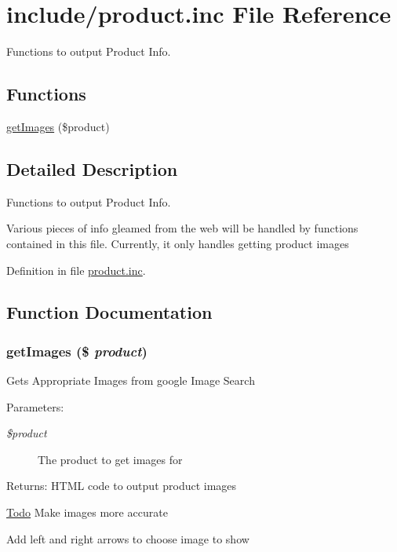\hypertarget{product_8inc}{
\section{include/product.inc File Reference}
\label{product_8inc}
}
Functions to output Product Info. 

\subsection*{Functions}
\begin{CompactItemize}
\item 
\hyperlink{product_8inc_9dbb778854cfe105058d7161ca8f058c}{getImages} (\$product)
\end{CompactItemize}


\subsection{Detailed Description}
Functions to output Product Info. 

Various pieces of info gleamed from the web will be handled by functions contained in this file. Currently, it only handles getting product images 

Definition in file \hyperlink{product_8inc-source}{product.inc}.

\subsection{Function Documentation}
\hypertarget{product_8inc_9dbb778854cfe105058d7161ca8f058c}{
\subsubsection{\setlength{\rightskip}{0pt plus 5cm}getImages (\$ {\em product})}}
\label{product_8inc_9dbb778854cfe105058d7161ca8f058c}


Gets Appropriate Images from google Image Search \begin{Desc}
\item[Parameters:]
\begin{description}
\item[{\em \$product}]The product to get images for \end{description}
\end{Desc}
\begin{Desc}
\item[Returns:]HTML code to output product images \end{Desc}
\begin{Desc}
\item[\hyperlink{todo__todo000001}{Todo}]Make images more accurate 

Add left and right arrows to choose image to show \end{Desc}


